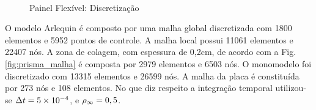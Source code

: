 \documentclass[tese_patricia]{subfiles}
\begin{document}
\begin{figure}[htb!]
	\centering
	\\ 
	\caption{Painel Flexível: Discretização}
\end{figure}

O modelo Arlequin é composto por uma malha global discretizada com 1800 elementos e 5952 pontos de controle. A malha local possui 11061 elementos e 22407 nós. A zona de colagem, com espessura de 0,2cm, de acordo com a Fig. \ref{fig:prisma_malha} é composta por 2979 elementos e 6503 nós.  O monomodelo foi discretizado com 13315 elementos e 26599 nós. A malha da placa é constituída por 273 nós e 108 elementos. No que diz respeito a integração temporal utilizou-se $\Delta t = 5\times10^{-4}$, e $\rho_\infty = 0,5$.
\end{document}
